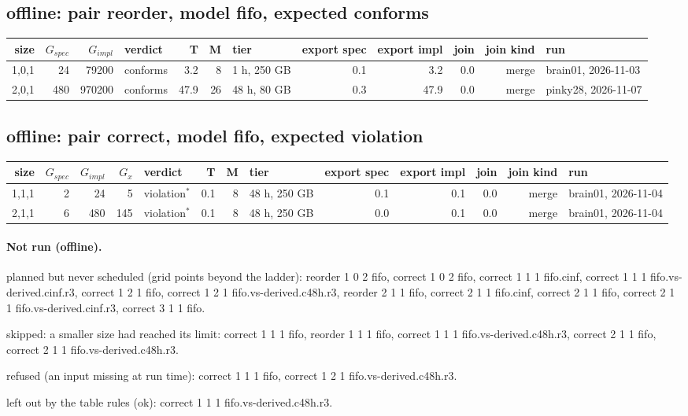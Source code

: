 \documentclass[10pt]{article}
\begin{document}
\subsection*{offline: pair \textsf{reorder}, model fifo, expected conforms}
\begin{longtable}{@{}rrrlrrlrrrrl@{}}
\toprule
size & $G_{\mathit{spec}}$ & $G_{\mathit{impl}}$ & verdict & T & M & tier & export spec & export impl & join & join kind & run \\
\midrule
\endhead
\color{blue} 1,0,1 & 24 & 79200 & conforms & 3.2 & 8 & 1 h, 250 GB & 0.1 & 3.2 & 0.0 & merge & brain01, 2026-11-03 \\
\color{blue} 2,0,1 & 480 & 970200 & conforms & 47.9 & 26 & 48 h, 80 GB & 0.3 & 47.9 & 0.0 & merge & pinky28, 2026-11-07 \\
\bottomrule
\end{longtable}
\subsection*{offline: pair \textsf{correct}, model fifo, expected violation}
\begin{longtable}{@{}rrrrlrrlrrrrl@{}}
\toprule
size & $G_{\mathit{spec}}$ & $G_{\mathit{impl}}$ & $G_x$ & verdict & T & M & tier & export spec & export impl & join & join kind & run \\
\midrule
\endhead
\color{red} 1,1,1 & 2 & 24 & 5 & violation$^{\ast}$ & 0.1 & 8 & 48 h, 250 GB & 0.1 & 0.1 & 0.0 & merge & brain01, 2026-11-04 \\
\color{red} 2,1,1 & 6 & 480 & 145 & violation$^{\ast}$ & 0.1 & 8 & 48 h, 250 GB & 0.0 & 0.1 & 0.0 & merge & brain01, 2026-11-04 \\
\bottomrule
\end{longtable}
\paragraph{Not run (offline).}
planned but never scheduled (grid points beyond the ladder): reorder 1 0 2 fifo, correct 1 0 2 fifo, correct 1 1 1 fifo.cinf, correct 1 1 1 fifo.vs-derived.cinf.r3, correct 1 2 1 fifo, correct 1 2 1 fifo.vs-derived.c48h.r3, reorder 2 1 1 fifo, correct 2 1 1 fifo.cinf, correct 2 1 1 fifo, correct 2 1 1 fifo.vs-derived.cinf.r3, correct 3 1 1 fifo.\par
skipped: a smaller size had reached its limit: correct 1 1 1 fifo, reorder 1 1 1 fifo, correct 1 1 1 fifo.vs-derived.c48h.r3, correct 2 1 1 fifo, correct 2 1 1 fifo.vs-derived.c48h.r3.\par
refused (an input missing at run time): correct 1 1 1 fifo, correct 1 2 1 fifo.vs-derived.c48h.r3.\par
left out by the table rules (ok): correct 1 1 1 fifo.vs-derived.c48h.r3.\par
\end{document}
